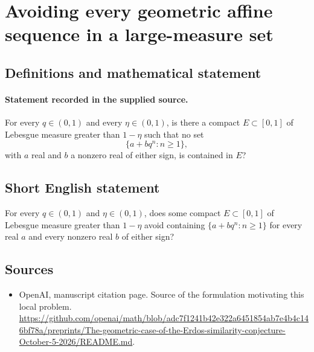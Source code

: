 \documentclass[11pt]{article}
\begin{document}
\section*{Avoiding every geometric affine sequence in a large-measure set}\label{statement}
\subsection{Definitions and mathematical statement}
\paragraph{Statement recorded in the supplied source.}
For every $q\in(0,1)$ and every $\eta\in(0,1)$, is there a compact $E\subset[0,1]$ of Lebesgue measure greater than $1-\eta$ such that no set
\[
\{a+bq^n:n\geq1\},
\]
with $a$ real and $b$ a nonzero real of either sign, is contained in $E$?
\subsection{Short English statement}
For every $q\in(0,1)$ and $\eta\in(0,1)$, does some compact $E\subset[0,1]$ of Lebesgue measure greater than $1-\eta$ avoid containing $\{a+bq^n:n\geq1\}$ for every real $a$ and every nonzero real $b$ of either sign?
\subsection{Sources}
\begin{itemize}
\item[S1] OpenAI, manuscript citation page. Source of the formulation motivating this local problem.
\url{https://github.com/openai/math/blob/adc7f1241b42e322a6451854ab7e4b4c146bf78a/preprints/The-geometric-case-of-the-Erdos-similarity-conjecture-October-5-2026/README.md}.
\end{itemize}
\end{document}
